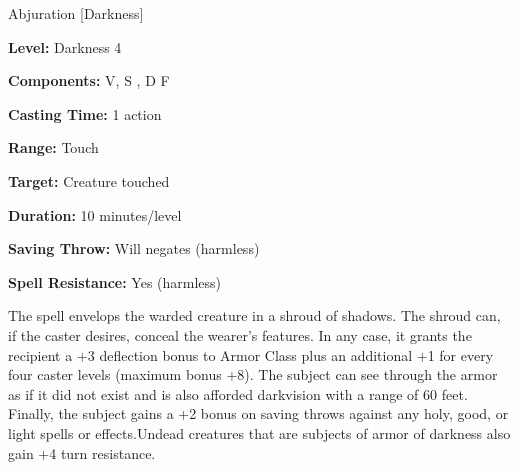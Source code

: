 
Abjuration [Darkness]

\textbf{Level:} Darkness 4

\textbf{Components:} V, S , D F

\textbf{Casting Time:} 1 action

\textbf{Range:} Touch

\textbf{Target:} Creature touched

\textbf{Duration:} 10 minutes/level

\textbf{Saving Throw:} Will negates (harmless)

\textbf{Spell Resistance:} Yes (harmless)

The spell envelops the warded creature in a shroud of shadows. The shroud can, 
if the caster desires, conceal the wearer's features. In any case, it grants the 
recipient a +3 deflection bonus to Armor Class plus an additional +1 for every 
four caster levels (maximum bonus +8). The subject can see through the armor as 
if it did not exist and is also afforded darkvision with a range of 60 feet. Finally, 
the subject gains a +2 bonus on saving throws against any holy, good, or light 
spells or effects.Undead creatures that are subjects of armor of darkness 
also gain +4 turn resistance.

